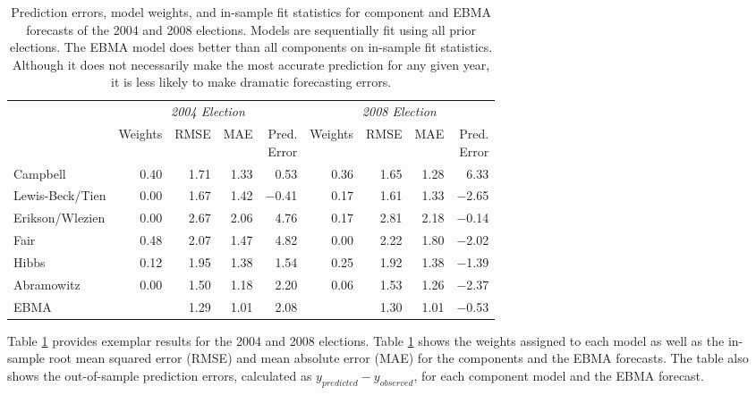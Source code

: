 \begin{table}[ht!]
  \caption{\footnotesize Prediction errors, model weights, and in-sample fit
    statistics for component and EBMA forecasts of the 2004 and 2008
    elections.  Models are sequentially fit using all prior elections.
    The EBMA model does better than all components on in-sample fit
    statistics.  Although it does not necessarily make the most accurate
    prediction for any given year, it is less likely to make
    dramatic forecasting errors.}
\label{Pres-Year-Res} \small
\begin{center}
\begin{tabular}{l rrrrrrrr}	
  \toprule
   &\multicolumn{4}{c}{\textit{2004 Election}} &\multicolumn{4}{c}{\textit{2008 Election}} \\ 
 &	Weights&	RMSE &MAE &\shortstack{Pred. \\ Error}
 &Weights&	RMSE&	MAE &  \shortstack{Pred.\\  Error}\\
\midrule
 Campbell               &0.40&1.71&1.33 &0.53&0.36&1.65&1.28&6.33\\
  Lewis-Beck/Tien 	&0.00&1.67&1.42&$-$0.41&	0.17&1.61&1.33&$-$2.65\\
  Erikson/Wlezien 	&0.00&2.67&2.06&4.76&0.17&2.81&2.18&$-$0.14\\
  Fair                      	&0.48&2.07&1.47&4.82&0.00&2.22&1.80&$-$2.02 \\
  Hibbs                   	&0.12&1.95&1.38&1.54&0.25&1.92&1.38&$-$1.39\\
  Abramowitz        	&0.00&1.50&1.18&2.20&0.06&1.53&1.26&$-$2.37\\
  EBMA                    	&	       	&1.29&1.01&2.08&
  &1.30&1.01&$-$0.53\\
\bottomrule
\end{tabular}
 \end{center}
 \end{table}



Table \ref{Pres-Year-Res} provides exemplar results for the 2004 and 2008
elections.  Table \ref{Pres-Year-Res} shows the
weights assigned to each model as well as the in-sample root mean
squared error (RMSE) and mean absolute error (MAE) for the components
and the EBMA forecasts.   The table also shows the out-of-sample prediction
errors, calculated as $y_{predicted}-y_{observed}$, for each component
model and the EBMA forecast.



